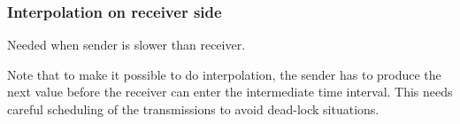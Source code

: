 \documentclass[a4paper]{report}
\begin{document}
\subsubsection{Interpolation on receiver side}

Needed when sender is slower than receiver.

Note that to make it possible to do interpolation, the sender has to
produce the next value before the receiver can enter the intermediate
time interval.  This needs careful scheduling of the transmissions to
avoid dead-lock situations.
\end{document}
